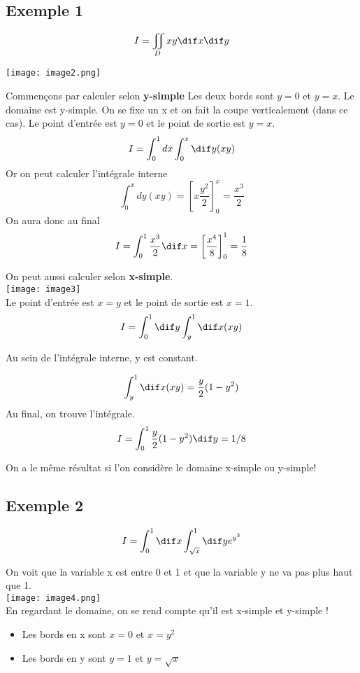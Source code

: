\subsection{Exemple 1}
\[ I=\iint_D xy \dif x \dif y \]
\begin{center}

\texttt{[image: image2.png]}

\end{center}
Commençons par calculer selon \textbf{y-simple}
Les deux bords sont $y=0$ et $y=x$. Le domaine est y-simple. On se fixe un x et on fait la coupe verticalement (dans ce cas). Le point d'entrée est $y=0$ et le point de sortie est $y=x$.
\[I=\int_0^1 dx \int_0^x \dif y(xy)\]
Or on peut calculer l'intégrale interne
\[\int_0^x dy(xy) = \left[ x \frac{y^2}{2} \right]_0^x = \frac{x^3}{2}\]
On aura donc au final
\[I=\int_0^1\frac{x^3}{2} \dif x = \left[\frac{x^4}{8}\right]_0^1= \frac{1}{8}\]

On peut aussi calculer selon \textbf{x-simple}.
\\
\texttt{[image: image3]}
\\

Le point d'entrée est $x=y$ et le point de sortie est $x=1$.
\[I=\int_0^1\dif y\int_y^1\dif x(xy)\]

Au sein de l'intégrale interne, y est constant.

\[\int_y^1\dif x(xy) = \frac{y}{2}(1-y^2)\]
Au final, on trouve l'intégrale.
\[I = \int_0^1 \frac{y}{2}(1-y^2) \dif y = 1/8\]

On a le même résultat si l'on considère le domaine x-simple ou y-simple!

\subsection{Exemple 2}
\[I = \int_0^1\dif x \int_{\sqrt{x}}^1 \dif y e^{y^3}\]

On voit que la variable x est entre 0 et 1 et que la variable y ne va pas plus haut que 1.
\\
\texttt{[image: image4.png]}
\\

En regardant le domaine, on se rend compte qu'il est x-simple et y-simple !
\begin{itemize}

\item Les bords en x sont $x=0$ et $x=y^2$
\item Les bords en y sont $y=1$ et $y=\sqrt{x}$


\end{itemize}

